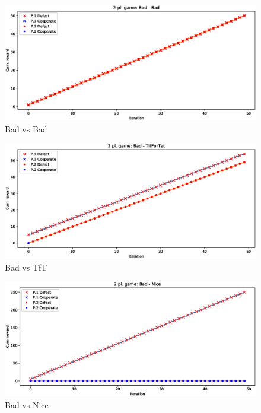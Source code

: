 \documentclass[journal,10pt,twoside]{IEEEtran}
\begin{document}
\begin{figure}[!ht]
    \centering
    \includegraphics[width=1\columnwidth]{../img/ipd2p/ipd2p-rewards-Bad-Bad}
    \caption{Bad vs Bad}
    \label{fig:badvsbad}
\end{figure}

\begin{figure}[!ht]
    \centering
    \includegraphics[width=1\columnwidth]{../img/ipd2p/ipd2p-rewards-Bad-TitForTat}
    \caption{Bad vs TfT}
    \label{fig:badvstft}
\end{figure}

\begin{figure}[!ht]
    \centering
    \includegraphics[width=1\columnwidth]{../img/ipd2p/ipd2p-rewards-Bad-Nice}
    \caption{Bad vs Nice}
    \label{fig:badvsnice}
\end{figure}
\end{document}
